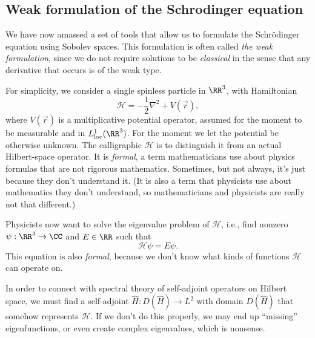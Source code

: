\subsection{Weak formulation of the Schrodinger equation}

We have now amassed a set of tools that allow us to formulate the Schr\"odinger equation using Sobolev spaces. This formulation is often called \emph{the weak formulation}, since we do not require solutions to be \emph{classical} in the sense that any derivative that occurs is of the weak type.

For simplicity, we consider a single spinless particle in $\RR^3$, with Hamiltonian
\begin{equation}
 \mathcal{H} = - \frac{1}{2}\nabla^2 + V(\vec{r}),
\end{equation}
where $V(\vec{r})$ is a multiplicative potential operator, assumed for the moment to be measurable and in $L^1_\text{loc}(\RR^3)$. For the moment we let the potential be otherwise unknown. The calligraphic $\mathcal{H}$ is to distinguish it from an actual Hilbert-space operator. It is \emph{formal}, a term mathematicians use about physics formulas that are not rigorous mathematics. Sometimes, but not always, it's just because they don't understand it. (It is also a term that physicists use about mathematics they don't understand, so mathematicians and physicists are really not that different.)

Physicists now want to solve the eigenvalue problem of $\mathcal{H}$, i.e., find nonzero $\psi : \RR^3 \to \CC$ and $E\in \RR$ such that
\begin{equation}
    \mathcal{H}\psi = E\psi. \label{eq:formal-se}
\end{equation}
This equation is also \emph{formal}, because we don't know what kinds of functions $\mathcal{H}$ can operate on.

In order to connect with spectral theory of self-adjoint operators on Hilbert space, we must find a self-adjoint $\hat{H} : D(\hat{H}) \to L^2$ with domain $D(\hat{H})$ that somehow represents $\mathcal{H}$. If we don't do this properly, we may end up ``missing'' eigenfunctions, or even create complex eigenvalues, which is nonsense.



